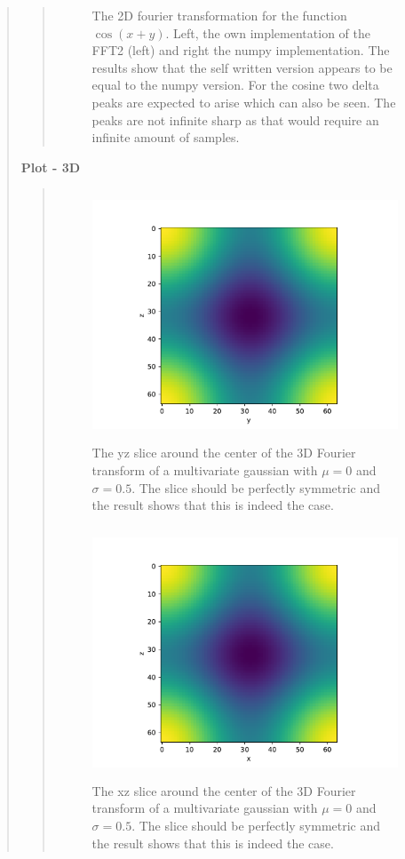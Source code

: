 \begin{quote}
\begin{quote}
\begin{figure}[!ht]
\caption{The 2D fourier transformation for the function $\cos(x+y)$. Left, the own implementation of the FFT2 (left) and right the numpy implementation. The results show that the self written version appears to be equal to the numpy version. For the cosine two delta peaks are expected to arise which can also be seen. The peaks are not infinite sharp as that would require an infinite amount of samples. }
\end{figure}
\end{quote}
\textbf{Plot - 3D}
\begin{quote}
\vspace*{-0.5cm}

\begin{figure}[!hb]
\centering
\includegraphics[width=14cm, height=7.5cm]{./Plots/5e_gaussian_yz.pdf}
\caption{The yz slice around the center of the 3D Fourier transform of a multivariate gaussian with $\mu = 0$ and $\sigma = 0.5$.  The slice should be perfectly symmetric and the result shows that this is indeed the case. }
\end{figure}
\newpage

\begin{figure}[!ht]
\centering
\includegraphics[width=14cm, height=7.5cm]{./Plots/5e_gaussian_xz.pdf}
\caption{The xz slice around the center of the 3D Fourier transform of a multivariate gaussian with $\mu = 0$ and $\sigma = 0.5$.  The slice should be perfectly symmetric and the result shows that this is indeed the case. }
\end{figure}


\end{quote}
\end{quote}
